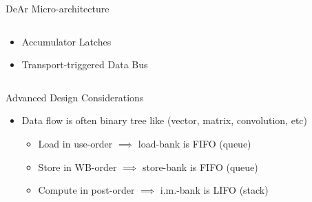 \documentclass[handout]{beamer}
\begin{document}
\begin{CJK}{UTF8}{bkai}
\begin{frame}{DeAr Micro-architecture}
\begin{columns}
\begin{column}{0.35\textwidth}
\begin{block}
\begin{itemize}
{\begin{itemize}
                                    \end{itemize}
                                }
                                \item <4->{Accumulator Latches}
                                \item <5->{Transport-triggered Data Bus}
                            \end{itemize}    
                        \end{block}
                    \end{column}
                \end{columns}
            \end{frame}

            \begin{frame}{Advanced Design Considerations}
                \centering
                {
                }
                \pause
                \begin{itemize}
                    \item {Data flow is often binary tree like (vector, matrix, convolution, etc)
                        \begin{itemize}
                                \pause
                            \item Load in use-order $\implies$ load-bank is FIFO (queue)
                                \pause
                            \item Store in WB-order $\implies$ store-bank is FIFO (queue)
                                \pause
                            \item Compute in post-order $\implies$ i.m.-bank is LIFO (stack)
                        \end{itemize}}
                \end{itemize}
            \end{frame}


\end{CJK}
\end{document}
